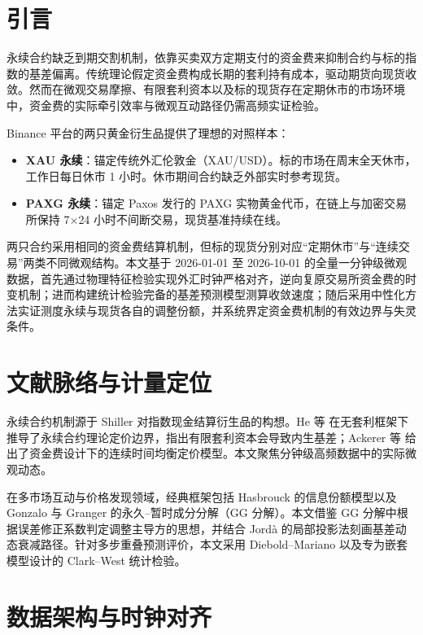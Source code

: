\documentclass[UTF8,zihao=5,a4paper]{ctexart}
\newcommand{\key}[1]{\textbf{#1}}
\begin{document}
\section{引言}
永续合约缺乏到期交割机制，依靠买卖双方定期支付的资金费来抑制合约与标的指数的基差偏离。传统理论假定资金费构成长期的套利持有成本，驱动期货向现货收敛。然而在微观交易摩擦、有限套利资本以及标的现货存在定期休市的市场环境中，资金费的实际牵引效率与微观互动路径仍需高频实证检验。

Binance 平台的两只黄金衍生品提供了理想的对照样本：
\begin{itemize}
\item \key{XAU 永续}：锚定传统外汇伦敦金（XAU/USD）。标的市场在周末全天休市，工作日每日休市 1 小时。休市期间合约缺乏外部实时参考现货。
\item \key{PAXG 永续}：锚定 Paxos 发行的 PAXG 实物黄金代币，在链上与加密交易所保持 7$\times$24 小时不间断交易，现货基准持续在线。
\end{itemize}
两只合约采用相同的资金费结算机制，但标的现货分别对应“定期休市”与“连续交易”两类不同微观结构。本文基于 2026-01-01 至 2026-10-01 的全量一分钟级微观数据，首先通过物理特征检验实现外汇时钟严格对齐，逆向复原交易所资金费的时变机制；进而构建统计检验完备的基差预测模型测算收敛速度；随后采用中性化方法实证测度永续与现货各自的调整份额，并系统界定资金费机制的有效边界与失灵条件。

\section{文献脉络与计量定位}
永续合约机制源于 Shiller\cite{shiller} 对指数现金结算衍生品的构想。He 等\cite{he} 在无套利框架下推导了永续合约理论定价边界，指出有限套利资本会导致内生基差；Ackerer 等\cite{ackerer} 给出了资金费设计下的连续时间均衡定价模型。本文聚焦分钟级高频数据中的实际微观动态。

在多市场互动与价格发现领域，经典框架包括 Hasbrouck\cite{hasbrouck} 的信息份额模型以及 Gonzalo 与 Granger\cite{gg} 的永久--暂时成分分解（GG 分解）。本文借鉴 GG 分解中根据误差修正系数判定调整主导方的思想，并结合 Jordà\cite{jorda} 的局部投影法刻画基差动态衰减路径。针对多步重叠预测评价，本文采用 Diebold--Mariano\cite{dm} 以及专为嵌套模型设计的 Clark--West\cite{cw} 统计检验。

\section{数据架构与时钟对齐}
\end{document}
